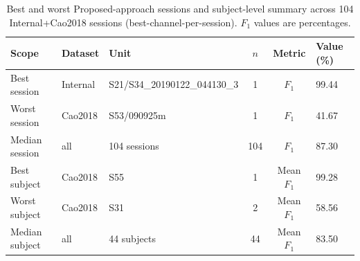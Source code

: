 \begin{table}[ht]
  \centering
  \caption{Best and worst Proposed-approach sessions and subject-level summary across 104 Internal+Cao2018 sessions (best-channel-per-session). $F_1$ values are percentages.}
  \label{tab:best-session}
  \begin{tabular}{lllccl}
    \toprule
    Scope & Dataset & Unit & $n$ & Metric & Value (\%) \\
    \midrule
    Best session & Internal & S21/S34\_20190122\_044130\_3 & 1 & $F_1$ & 99.44 \\
    Worst session & Cao2018 & S53/090925m & 1 & $F_1$ & 41.67 \\
    Median session & all & 104 sessions & 104 & $F_1$ & 87.30 \\
    Best subject & Cao2018 & S55 & 1 & Mean $F_1$ & 99.28 \\
    Worst subject & Cao2018 & S31 & 2 & Mean $F_1$ & 58.56 \\
    Median subject & all & 44 subjects & 44 & Mean $F_1$ & 83.50 \\
    \bottomrule
  \end{tabular}
\end{table}
